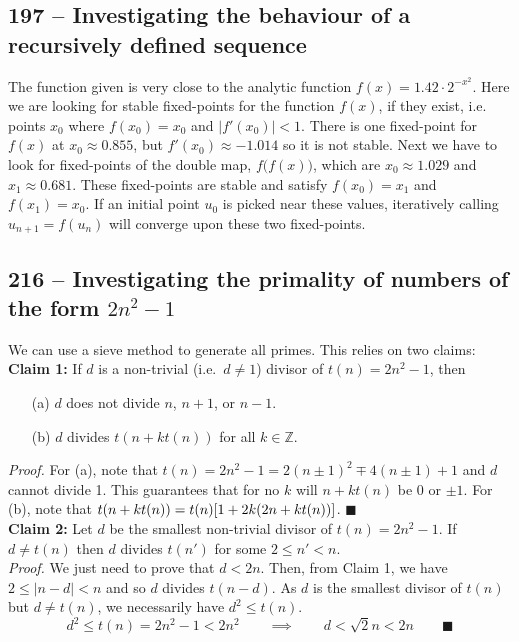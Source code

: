 \documentclass{article}
\begin{document}
\subsection*{197 -- Investigating the behaviour of a recursively defined sequence} 
The function given is very close to the analytic function $f(x) = 1.42\cdot2^{-x^2}$. 
Here we are looking for stable fixed-points for the function $f(x)$, if they exist, i.e. points $x_0$ where $f(x_0) = x_0$ and $|f'(x_0)| < 1$. 
There is one fixed-point for $f(x)$ at $x_0 \approx 0.855$, but $f'(x_0) \approx -1.014$ so it is not stable. 
Next we have to look for fixed-points of the double map, $f\big(f(x)\big)$, which are $x_0 \approx 1.029$ and $x_1 \approx 0.681$. 
These fixed-points are stable and satisfy $f(x_0) = x_1$ and $f(x_1) = x_0$. 
If an initial point $u_0$ is picked near these values, iteratively calling $u_{n+1} = f(u_n)$ will converge upon these two fixed-points.

\subsection*{216 -- Investigating the primality of numbers of the form $2n^2 - 1$}

We can use a sieve method to generate all primes.
This relies on two claims: \\

\textbf{Claim 1:} If $d$ is a non-trivial (i.e.~$d \neq 1$) divisor of $t(n) = 2n^2 - 1$, then
\begin{itemize}
\item[(a)] $d$ does not divide $n$, $n+1$, or $n-1$.
\item[(b)] $d$ divides $t(n + k t(n))$ for all $k \in \mathbb{Z}$.
\end{itemize}
\emph{Proof.} For (a), note that $t(n) = 2n^2 - 1 = 2(n \pm 1)^2 \mp 4(n \pm 1) + 1$ and $d$ cannot divide 1.
This guarantees that for no $k$ will $n + kt(n)$ be 0 or $\pm 1$.
For (b), note that $t(n + kt(n)) = t(n)\qty[ 1 + 2k(2n + kt(n))]$. $\blacksquare$ \\

\textbf{Claim 2:} Let $d$ be the smallest non-trivial divisor of $t(n) = 2n^2 - 1$.
If $d \neq t(n)$ then $d$ divides $t(n')$ for some $2 \leq n' < n$. \\

\emph{Proof.} We just need to prove that $d < 2n$. 
Then, from Claim 1, we have $2 \leq |n - d| < n$ and so $d$ divides $t(n-d)$. 
As $d$ is the smallest divisor of $t(n)$ but $d \neq t(n)$, we necessarily have $d^2 \leq t(n)$.
\[ d^2 \leq t(n) = 2n^2 - 1 < 2n^2 \qquad\implies\qquad d < \sqrt{2} n < 2 n \qquad \blacksquare\]
\end{document}
